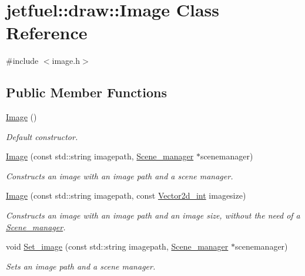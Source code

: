 \hypertarget{classjetfuel_1_1draw_1_1Image}{}\section{jetfuel\+:\+:draw\+:\+:Image Class Reference}
\label{classjetfuel_1_1draw_1_1Image}


{\ttfamily \#include $<$image.\+h$>$}

\subsection*{Public Member Functions}
\begin{DoxyCompactItemize}
\item 
\hyperlink{classjetfuel_1_1draw_1_1Image_a63078fc295eb37ef549e17187d839574}{Image} ()
\begin{DoxyCompactList}\small\item\em Default constructor. \end{DoxyCompactList}\item 
\hyperlink{classjetfuel_1_1draw_1_1Image_a36c7a9de74ed515a90b5688d7efb040c}{Image} (const std\+::string imagepath, \hyperlink{classjetfuel_1_1draw_1_1Scene__manager}{Scene\+\_\+manager} $\ast$scenemanager)
\begin{DoxyCompactList}\small\item\em Constructs an image with an image path and a scene manager. \end{DoxyCompactList}\item 
\hyperlink{classjetfuel_1_1draw_1_1Image_a80771f30728e311a58d7e0fa5844a6d5}{Image} (const std\+::string imagepath, const \hyperlink{classjetfuel_1_1draw_1_1Vector2d}{Vector2d\+\_\+int} imagesize)
\begin{DoxyCompactList}\small\item\em Constructs an image with an image path and an image size, without the need of a \hyperlink{classjetfuel_1_1draw_1_1Scene__manager}{Scene\+\_\+manager}. \end{DoxyCompactList}\item 
void \hyperlink{classjetfuel_1_1draw_1_1Image_a2259992a6ae87fdebfe088f07a7bcc4e}{Set\+\_\+image} (const std\+::string imagepath, \hyperlink{classjetfuel_1_1draw_1_1Scene__manager}{Scene\+\_\+manager} $\ast$scenemanager)
\begin{DoxyCompactList}\small\item\em Sets an image path and a scene manager. \end{DoxyCompactList}\item 

\end{DoxyCompactItemize}
